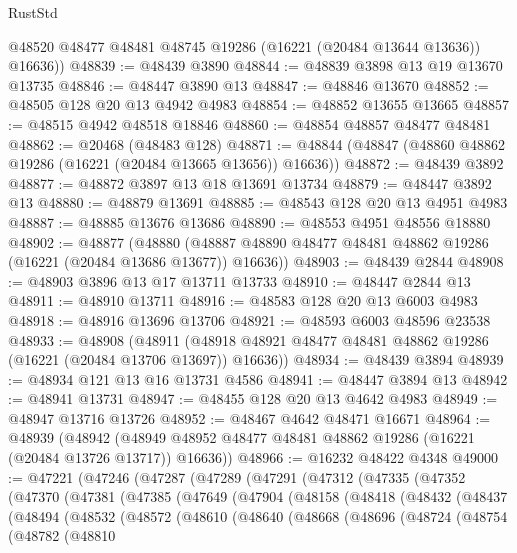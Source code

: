 \begin{lexlean}{RustStd}
\begin{coremodule}
        @48520
        @48477
        @48481
        @48745
        @19286
        (@16221 (@20484 @13644 @13636))
        @16636))
@48839 := @48439 @3890
@48844 := @48839 @3898 @13 @19 @13670 @13735
@48846 := @48447 @3890 @13
@48847 := @48846 @13670
@48852 := @48505 @128 @20 @13 @4942 @4983
@48854 := @48852 @13655 @13665
@48857 := @48515 @4942 @48518 @18846
@48860 := @48854 @48857 @48477 @48481
@48862 := @20468 (@48483 @128)
@48871 := @48844 (@48847 (@48860 @48862 @19286 (@16221 (@20484 @13665 @13656)) @16636))
@48872 := @48439 @3892
@48877 := @48872 @3897 @13 @18 @13691 @13734
@48879 := @48447 @3892 @13
@48880 := @48879 @13691
@48885 := @48543 @128 @20 @13 @4951 @4983
@48887 := @48885 @13676 @13686
@48890 := @48553 @4951 @48556 @18880
@48902 := @48877
    (@48880 (@48887 @48890 @48477 @48481 @48862 @19286 (@16221 (@20484 @13686 @13677)) @16636))
@48903 := @48439 @2844
@48908 := @48903 @3896 @13 @17 @13711 @13733
@48910 := @48447 @2844 @13
@48911 := @48910 @13711
@48916 := @48583 @128 @20 @13 @6003 @4983
@48918 := @48916 @13696 @13706
@48921 := @48593 @6003 @48596 @23538
@48933 := @48908
    (@48911 (@48918 @48921 @48477 @48481 @48862 @19286 (@16221 (@20484 @13706 @13697)) @16636))
@48934 := @48439 @3894
@48939 := @48934 @121 @13 @16 @13731 @4586
@48941 := @48447 @3894 @13
@48942 := @48941 @13731
@48947 := @48455 @128 @20 @13 @4642 @4983
@48949 := @48947 @13716 @13726
@48952 := @48467 @4642 @48471 @16671
@48964 := @48939
    (@48942 (@48949 @48952 @48477 @48481 @48862 @19286 (@16221 (@20484 @13726 @13717)) @16636))
@48966 := @16232 @48422 @4348
@49000 := @47221
    (@47246
      (@47287
        (@47289
          (@47291
            (@47312
              (@47335
                (@47352
                  (@47370
                    (@47381
                      (@47385
                        (@47649
                          (@47904
                            (@48158
                              (@48418
                                (@48432
                                  (@48437
                                    (@48494
                                      (@48532
                                        (@48572
                                          (@48610
                                            (@48640
                                              (@48668
                                                (@48696
                                                  (@48724
                                                    (@48754
                                                      (@48782
                                                        (@48810

\end{coremodule}
\end{lexlean}
